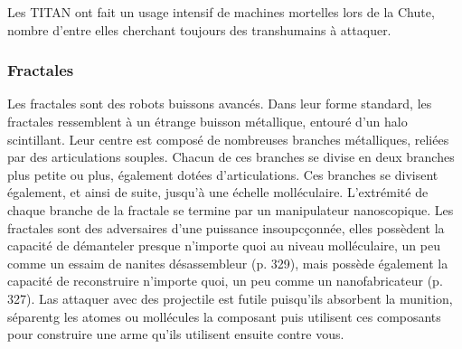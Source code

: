 Les TITAN ont fait un usage intensif de machines mortelles lors de la Chute, nombre d'entre elles cherchant toujours des transhumains à attaquer. 

\subsubsection{Fractales } 

Les fractales sont des robots buissons avancés. Dans leur forme standard, les fractales ressemblent à un étrange buisson métallique, entouré d'un halo scintillant. Leur centre est composé de nombreuses branches métalliques, reliées par des articulations souples. Chacun de ces branches se divise en deux branches plus petite ou plus, également dotées d'articulations. Ces branches se divisent également, et ainsi de suite, jusqu'à une échelle molléculaire. L'extrémité de chaque branche de la fractale se termine par un manipulateur nanoscopique. Les fractales sont des adversaires d'une puissance insoupcçonnée, elles possèdent la capacité de démanteler presque n'importe quoi au niveau molléculaire, un peu comme un essaim de nanites désassembleur (p. 329), mais possède également la capacité de reconstruire n'importe quoi, un peu comme un nanofabricateur (p. 327). Las attaquer avec des projectile est futile puisqu'ils absorbent la munition, séparentg les atomes ou mollécules la composant puis utilisent ces composants pour construire une arme qu'ils utilisent ensuite contre vous. 

